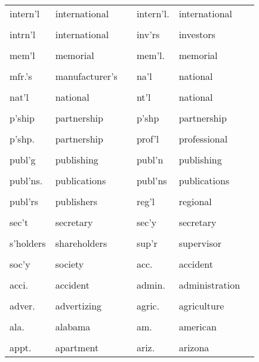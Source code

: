 \documentclass[10pt, letterpaper]{article}
\begin{document}
\begin{spacing}{1.0}
\begin{footnotesize}
\begin{longtable}[H]{p{1in}>{\raggedright}p{2in} p{0.2in} p{1in}>{\raggedright}p{2in} p{0in}}
    intern'l & international & & intern'l. & international &\\
    &  &  &  &  & \\[-6pt]
    intrn'l & international & & inv'rs & investors &\\
    &  &  &  &  & \\[-6pt]
    mem'l & memorial & & mem'l. & memorial &\\
    &  &  &  &  & \\[-6pt]
    mfr.'s & manufacturer's & & na'l & national &\\
    &  &  &  &  & \\[-6pt]
    nat'l & national & & nt'l & national &\\
    &  &  &  &  & \\[-6pt]
    p'ship & partnership & & p'shp & partnership &\\
    &  &  &  &  & \\[-6pt]
    p'shp. & partnership & & prof'l & professional &\\
    &  &  &  &  & \\[-6pt]
    publ'g & publishing & & publ'n & publishing &\\
    &  &  &  &  & \\[-6pt]
    publ'ns. & publications & & publ'ns & publications &\\
    &  &  &  &  & \\[-6pt]
    publ'rs & publishers & & reg'l & regional &\\
    &  &  &  &  & \\[-6pt]
    sec't & secretary & & sec'y & secretary &\\
    &  &  &  &  & \\[-6pt]
    s'holders & shareholders & & sup'r & supervisor &\\
    &  &  &  &  & \\[-6pt]
    soc'y & society & & acc. & accident &\\
    &  &  &  &  & \\[-6pt]
    acci. & accident & & admin. & administration &\\
    &  &  &  &  & \\[-6pt]
    adver. & advertizing & & agric. & agriculture &\\
    &  &  &  &  & \\[-6pt]
    ala. & alabama & & am. & american &\\
    &  &  &  &  & \\[-6pt]
    appt. & apartment & & ariz. & arizona &\\

\end{longtable}
\end{footnotesize}
\end{spacing}
\end{document}
